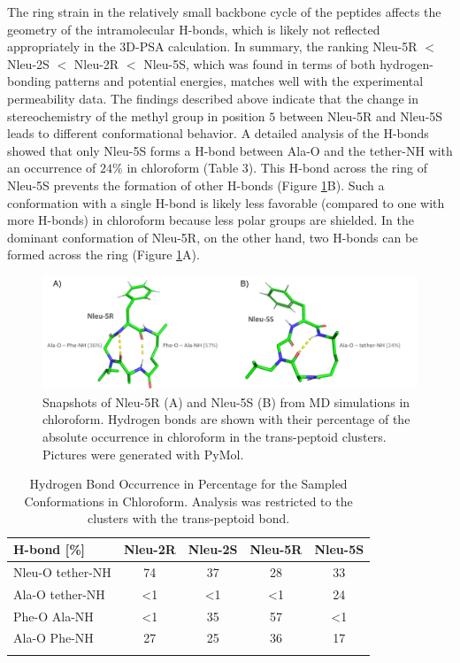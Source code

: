 The ring strain in the relatively small backbone cycle of the peptides affects the geometry of the intramolecular H-bonds, which is likely not reflected appropriately in the 3D-PSA calculation. 
In summary, the ranking Nleu-5R $<$ Nleu-2S $<$ Nleu-2R $<$ Nleu-5S, which was found in terms of both hydrogen-bonding patterns and potential energies, matches well with the experimental permeability data.
The findings described above indicate that the change in stereochemistry of the methyl group in position $5$ between Nleu-5R and Nleu-5S leads to different conformational behavior. 
A detailed analysis of the H-bonds showed that only Nleu-5S forms a H-bond between Ala-O and the tether-NH with an occurrence of $24\%$ in chloroform (Table 3). 
This H-bond across the ring of Nleu-5S prevents the formation of other H-bonds (Figure \ref{fig: HbondExamples}B).
Such a conformation with a single H-bond is likely less favorable (compared to one with more H-bonds) in chloroform because less polar groups are shielded. In the dominant conformation of Nleu-5R, on the other hand, two H-bonds can be formed across the ring (Figure \ref{fig: HbondExamples}A).
\begin{figure}[h!]
    \centering
    \includegraphics[width=\textwidth]{fig/results/ExampleHbonds.png}
    \caption{Snapshots of Nleu-5R (A) and Nleu-5S (B) from MD simulations in chloroform. Hydrogen bonds are shown with their percentage of the absolute occurrence in chloroform in the trans-peptoid clusters. Pictures were generated with PyMol. \cite{Delano2020}}
    \label{fig: HbondExamples}
\end{figure}

\begin{table}[h!]
    \centering
    \caption{Hydrogen Bond Occurrence in Percentage for the Sampled Conformations in Chloroform. Analysis was restricted to the clusters with the trans-peptoid bond.}
    \label{tab: hbondsrationCLCH3}
    \begin{adjustbox}{max width=\textwidth}
    \begin{tabular}{lcccc}
    H-bond  [\%] &	Nleu-2R &	Nleu-2S &	Nleu-5R &	Nleu-5S  \\
    \hline
    Nleu-O tether-NH &	74 &	37 &	28 &	33 \\
    Ala-O tether-NH &	\textless{}1 & \textless{}1 &	\textless{}1 &	24 \\
    Phe-O Ala-NH    &	\textless{}1 &	35 &	57 &	\textless{}1 \\
    Ala-O Phe-NH    &	27 &	25 &	36 &	17 \\
    \hline\\
    \end{tabular}
    \end{adjustbox}
\end{table}

